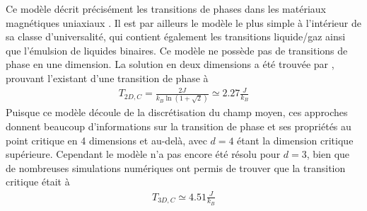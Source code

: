 Ce modèle décrit précisément les transitions de phases dans les matériaux magnétiques uniaxiaux \cite{de_jongh_experiments_1974,wp_wold_ising_2000,ikeda_neutron_nodate}. Il est par ailleurs le modèle le plus simple à l'intérieur de sa classe d'universalité, qui contient également les transitions liquide/gaz ainsi que l'émulsion de liquides binaires. Ce modèle ne possède pas de transitions de phase en une dimension. La solution en deux dimensions a été trouvée par \cite{onsager_crystal_1944}, prouvant l'existant d'une transition de phase à 
\begin{align}
     T_{2D,C} = \frac{2J}{k_B \ln(1 + \sqrt{2})} \simeq 2.27 \frac{J}{k_B}
\end{align}
Puisque ce modèle découle de la discrétisation du champ moyen, ces approches donnent beaucoup d'informations sur la transition de phase et ses propriétés au point critique en 4 dimensions et au-delà, avec $d=4$ étant la dimension critique supérieure. Cependant le modèle n'a pas encore été résolu pour $d=3$, bien que de nombreuses simulations numériques \cite{preis_gpu_2009} ont permis de trouver que la transition critique était à
\begin{align}
    T_{3D,C} \simeq 4.51 \frac{J}{k_B}
\end{align}

